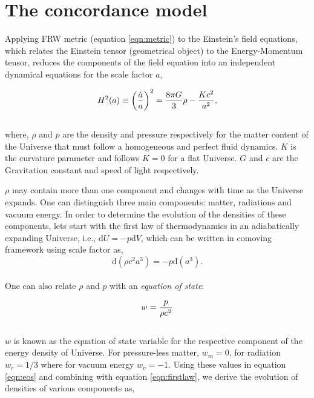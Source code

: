 \section{The concordance model}


Applying FRW metric (equation \ref{eqn:metric}) to the Einstein's field equations, 
which relates the Einstein tensor (geometrical object) to the Energy-Momentum tensor, 
reduces the components of the field equation into an independent dynamical equations
for the scale factor $a$,

\begin{equation}
\centering
H^2(a) \equiv \left( \dfrac{\dot{a}}{a} \right)^2 = 
			\dfrac{8 \pi G}{3} \rho - \dfrac{Kc^2}{a^2},
\label{eqn:fe1}
\end{equation}
\\
where, $\rho$ and $p$ are the density and pressure respectively for the matter content
of the Universe that must follow a homogeneous and perfect fluid dynamics. 
$K$ is the curvature parameter and follows $K=0$ for a flat Universe. $G$ and $c$ are
the Gravitation constant and speed of light respectively. 

$\rho$ may contain more than one component and changes with time as the Universe 
expands. One can distinguish three main components: matter, radiations and vacuum 
energy. In order to determine the evolution of the densities of these components,
lets start with the first law of thermodynamics in an adiabatically expanding Universe,
i.e., $\mathrm{d}U = -p\mathrm{d}V$, which can be written in comoving framework
using scale factor as,
\begin{equation}
	\mathrm{d}(\rho c^2 a^3) = -p \mathrm{d} (a^3).
	\label{eqn:firstlaw}
\end{equation}
\\
One can also relate $\rho$ and $p$ with an {\it equation of state}:

\begin{equation}
\centering
w = \dfrac{p}{\rho c^2}
\label{eqn:eos}
\end{equation}
\\
$w$ is known as the equation of state variable for the respective component
of the energy density of Universe. For pressure-less matter, $w_m=0$,
for radiation $w_r=1/3$ where for vacuum energy $w_v=-1$. Using these values 
in equation \ref{eqn:eos} and combining with equation \ref{eqn:firstlaw}, we 
derive the evolution of densities of various components as,

